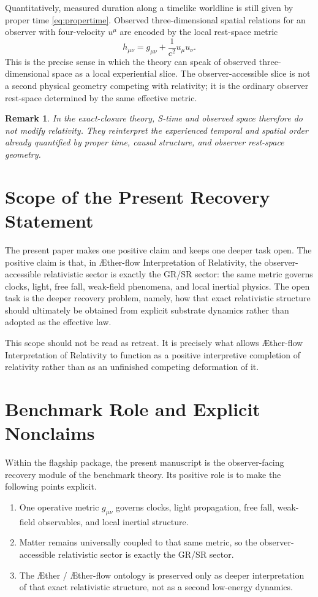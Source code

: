 \documentclass[11pt]{article}
\newcommand{\Aether}{\AE{}ther}
\newcommand{\Aflow}{\AE{}ther-flow}
\newcommand{\TheoryName}{\Aflow{} Interpretation of Relativity}
\newtheorem{remark}{Remark}
\begin{document}
Quantitatively, measured duration along a timelike worldline is still given by proper time \eqref{eq:propertime}. Observed three-dimensional spatial relations for an observer with four-velocity \(u^\mu\) are encoded by the local rest-space metric
\begin{equation}
h_{\mu\nu}
=
g_{\mu\nu}
+
\frac{1}{c^2}u_\mu u_\nu.
\label{eq:spatialprojector}
\end{equation}
This is the precise sense in which the theory can speak of observed three-dimensional space as a local experiential slice. The observer-accessible slice is not a second physical geometry competing with relativity; it is the ordinary observer rest-space determined by the same effective metric.

\begin{remark}
In the exact-closure theory, S-time and observed space therefore do not modify relativity. They reinterpret the experienced temporal and spatial order already quantified by proper time, causal structure, and observer rest-space geometry.
\end{remark}

\section{Scope of the Present Recovery Statement}

The present paper makes one positive claim and keeps one deeper task open. The positive claim is that, in \TheoryName{}, the observer-accessible relativistic sector is exactly the GR/SR sector: the same metric governs clocks, light, free fall, weak-field phenomena, and local inertial physics. The open task is the deeper recovery problem, namely, how that exact relativistic structure should ultimately be obtained from explicit substrate dynamics rather than adopted as the effective law.

This scope should not be read as retreat. It is precisely what allows \TheoryName{} to function as a positive interpretive completion of relativity rather than as an unfinished competing deformation of it.

\section{Benchmark Role and Explicit Nonclaims}

Within the flagship package, the present manuscript is the observer-facing recovery module of the benchmark theory. Its positive role is to make the following points explicit.
\begin{enumerate}
    \item One operative metric \(g_{\mu\nu}\) governs clocks, light propagation, free fall, weak-field observables, and local inertial structure.
    \item Matter remains universally coupled to that same metric, so the observer-accessible relativistic sector is exactly the GR/SR sector.
    \item The \Aether{} / \Aflow{} ontology is preserved only as deeper interpretation of that exact relativistic structure, not as a second low-energy dynamics.
\end{enumerate}
\end{document}

